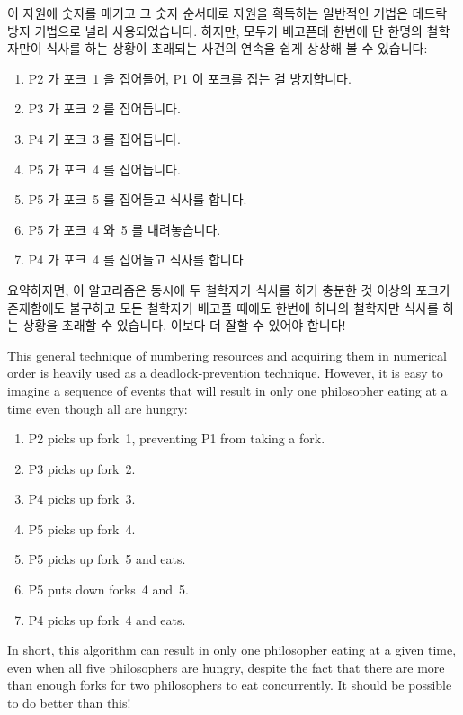 \fi

이 자원에 숫자를 매기고 그 숫자 순서대로 자원을 획득하는 일반적인 기법은 데드락
방지 기법으로 널리 사용되었습니다.
하지만, 모두가 배고픈데 한번에 단 한명의 철학자만이 식사를 하는 상황이 초래되는
사건의 연속을 쉽게 상상해 볼 수 있습니다:

\begin{enumerate}
    \item P2 가 포크~1 을 집어들어, P1 이 포크를 집는 걸 방지합니다.
    \item P3 가 포크~2 를 집어듭니다.
    \item P4 가 포크~3 를 집어듭니다.
    \item P5 가 포크~4 를 집어듭니다.
    \item P5 가 포크~5 를 집어들고 식사를 합니다.
    \item P5 가 포크~4 와~5 를 내려놓습니다.
    \item P4 가 포크~4 를 집어들고 식사를 합니다.
\end{enumerate}

요약하자면, 이 알고리즘은 동시에 두 철학자가 식사를 하기 충분한 것 이상의
포크가 존재함에도 불구하고 모든 철학자가 배고플 때에도 한번에 하나의 철학자만
식사를 하는 상황을 초래할 수 있습니다.
이보다 더 잘할 수 있어야 합니다!

\iffalse

This general technique of numbering resources and acquiring them in
numerical order is heavily used as a deadlock-prevention technique.
However, it is easy to imagine a sequence of events that will result
in only one philosopher eating at a time even though all are hungry:

\begin{enumerate}
    \item P2 picks up fork~1, preventing P1 from taking a fork.
    \item P3 picks up fork~2.
    \item P4 picks up fork~3.
    \item P5 picks up fork~4.
    \item P5 picks up fork~5 and eats.
    \item P5 puts down forks~4 and~5.
    \item P4 picks up fork~4 and eats.
\end{enumerate}

In short, this algorithm can result in only one philosopher eating at
a given time, even when all five philosophers are hungry,
despite the fact that there are more than enough forks for two
philosophers to eat concurrently.
It should be possible to do better than this!

